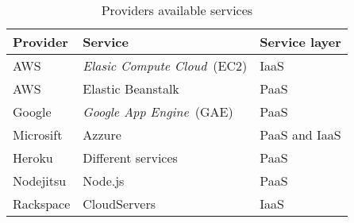\begin{table}
  \begin{tabular}{ | l | l | l | }
    \hline
    \textbf{Provider} & \textbf{Service} & \textbf{Service layer} \\ \hline
    AWS & \emph{Elasic Compute Cloud}~(EC2) & IaaS \\ \hline
    AWS & Elastic Beanstalk & PaaS \\ \hline
    Google & \emph{Google App Engine}~(GAE) & PaaS \\ \hline
    Microsift & Azzure & PaaS and IaaS \\ \hline
    Heroku & Different services & PaaS \\ \hline
    Nodejitsu & Node.js & PaaS \\ \hline
    Rackspace & CloudServers & IaaS \\ \hline
  \end{tabular}
  \caption{Providers available services}
  \label{table:providerservices}
\end{table}

